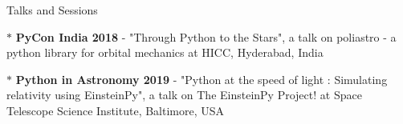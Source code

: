 \documentclass{resume} %
\begin{document}

\begin{rSection}{Talks and Sessions}

$*$ \textbf{PyCon India 2018} - "Through Python to the Stars", a talk on poliastro - a python library for orbital mechanics at HICC, Hyderabad, India

$*$ \textbf{Python in Astronomy 2019} - "Python at the speed of light : Simulating relativity using EinsteinPy", a talk on The EinsteinPy Project!  at Space Telescope Science Institute, Baltimore, USA
\end{rSection}


 
\end{document}
